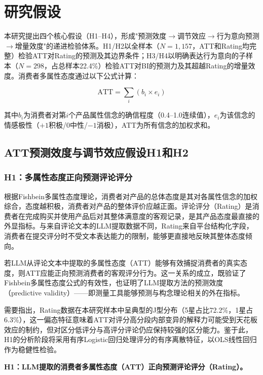 \section{研究假设}

本研究提出四个核心假设（H1--H4），形成"预测效度$\to$调节效应$\to$行为意向预测$\to$增量效度"的递进检验体系。H1/H2以全样本（$N=1{,}157$，ATT和Rating均完整）检验ATT对Rating的预测及其边界条件；H3/H4以明确表达行为意向的子样本（$N=298$，占总样本22.4\%）检验ATT对BI的预测力及其超越Rating的增量效度。消费者多属性态度通过以下公式计算：

\begin{equation}
\text{ATT} = \sum_{i}(b_i \times e_i)
\end{equation}

其中$b_i$为消费者对第$i$个产品属性信念的确信程度（0.4--1.0连续值），$e_i$为该信念的情感极性（$+1$积极/$0$中性/$-1$消极），ATT为所有信念的加权求和。

\subsection{ATT预测效度与调节效应假设H1和H2}

\subsubsection{H1：多属性态度正向预测评论评分}

根据Fishbein多属性态度理论\cite{fishbein1975}，消费者对产品的总体态度是其对各属性信念的加权综合，态度越积极，消费者对产品的整体评价应越正面。评论评分（Rating）是消费者在完成购买并使用产品后对其整体满意度的客观记录，是其产品态度最直接的外显指标。与来自评论文本的LLM提取数据不同，Rating来自平台结构化字段，消费者在提交评分时不受文本表达能力的限制，能够更直接地反映其整体态度倾向。

若LLM从评论文本中提取的多属性态度（ATT）能够有效捕捉消费者的真实态度，则ATT应能正向预测消费者的客观评分行为。这一关系的成立，既验证了Fishbein多属性态度公式的有效性，也证明了LLM提取方法的预测效度（predictive validity）——即测量工具能够预测与构念理论相关的外在指标。

需要指出，Rating数据在本研究样本中呈典型的J型分布（5星占比72.2\%，1星占6.3\%），这一偏态特征意味着ATT对评分高分段内部变异的解释力可能受到天花板效应的制约，但对区分低评分与高评分评论仍应保持较强的区分能力。鉴于此，H1的分析阶段将采用有序Logistic回归处理评分的有序离散特征\cite{duan2023,kim2022}，以OLS线性回归作为稳健性检验。

\textbf{H1：LLM提取的消费者多属性态度（ATT）正向预测评论评分（Rating）。}

